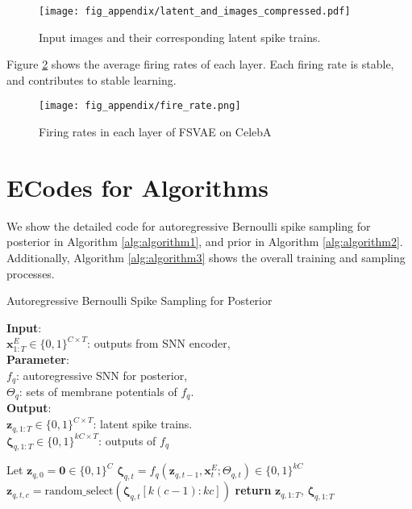 \documentclass[letterpaper]{article} %
\begin{document}
\begin{figure}[htbp]
    \centering
    \texttt{[image: fig\_appendix/latent\_and\_images\_compressed.pdf]} 
    \caption{Input images and their corresponding latent spike trains.}
    \label{fig:latent_and_images}
\end{figure}

Figure \ref{fig:fire_rate} shows the average firing rates of each layer. Each firing rate is stable, and contributes to stable learning. 

\begin{figure}[htbp]
    \centering
    \texttt{[image: fig\_appendix/fire\_rate.png]} 
    \caption{Firing rates in each layer of FSVAE on CelebA}
    \label{fig:fire_rate}
\end{figure}

\clearpage

\section{E\quad Codes for Algorithms}
We show the detailed code for autoregressive Bernoulli spike sampling for posterior in Algorithm \ref{alg:algorithm1}, and prior in Algorithm \ref{alg:algorithm2}. Additionally, Algorithm \ref{alg:algorithm3} shows the overall training and sampling processes.
\begin{algorithm}[htb]
\caption{Autoregressive Bernoulli Spike Sampling for Posterior}
\label{alg:algorithm1}
\textbf{Input}:\\
\qquad $\bm{x}_{1:T}^E\in \{0,1\}^{C\times T}$: outputs from SNN encoder,\\
\textbf{Parameter}:\\
\qquad $f_q$: autoregressive SNN for posterior,\\
\qquad $\Theta_q$: sets of membrane potentials of $f_q$. \\
\textbf{Output}:\\
$\bm{z}_{q,1:T}\in \{0,1\}^{C\times T}$: latent spike trains.\\
$\bm{\zeta}_{q,1:T}\in \{0,1\}^{kC\times T}$: outputs of $f_q$\\
\begin{algorithmic}[1] %
\State Let $\bm{z}_{q,0}=\bm{0} \in \{0,1\}^C$
\State $\bm{\zeta}_{q,t} = f_q (\bm{z}_{q,t-1}, \bm{x}_t^E ; \Theta_{q,t}) \in \{0,1\}^{kC}$
\State $\bm{z}_{q,t,c} = \mathrm{random\_select}(\bm{\zeta}_{q,t}[k(c-1):kc])$
\EndFor
\EndFor
\State \textbf{return} $\bm{z}_{q,1:T}$, $\bm{\zeta}_{q,1:T}$
\EndFunction
\end{algorithmic}
\end{algorithm}
\end{document}
